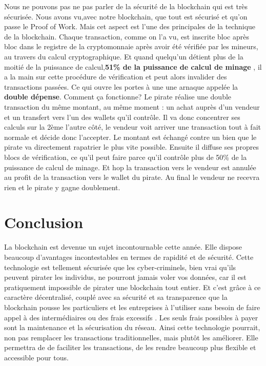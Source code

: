 \documentclass[12pt]{report}
\begin{document}
\hspace{1cm} Nous ne pouvons pas ne pas parler de la sécurité de la blockchain qui est très sécurisée. Nous avons vu,avec notre blockchain, que tout est sécurisé et qu'on passe le Proof of Work. Mais cet aspect est l'une des principales de la technique de la blockchain. Chaque transaction, comme on l'a vu, est inscrite bloc après bloc dans le registre de la cryptomonnaie après avoir été vérifiée par les mineurs, au travers du calcul cryptographique. Et quand quelqu’un détient plus de la moitié de la puissance de calcul,\textbf{51\% de la puissance de calcul de minage} , il a la main sur cette procédure de vérification et peut alors invalider des transactions passées. Ce qui ouvre les portes à une une arnaque appelée la  \textbf{double dépense}. Comment ça fonctionne? Le pirate réalise une double transaction du même montant, au même moment : un achat auprès d'un vendeur et un transfert vers l'un des wallets qu'il contrôle. Il va donc concentrer ses calculs sur la 2ème l'autre côté, le vendeur voit arriver une transaction tout à fait normale et décide donc l’accepter. Le montant est échangé contre un bien que le pirate va directement rapatrier le plus vite possible. Ensuite il diffuse ses propres blocs de vérification, ce qu'il peut faire parce qu'il contrôle plus de 50\% de la puissance de calcul de minage. Et hop la transaction vers le vendeur est annulée au profit de la transaction vers le wallet du pirate. Au final le vendeur ne recevra rien et le pirate y gagne doublement.

 
\newpage    
\section{Conclusion}

\hspace{1cm} La blockchain est devenue un sujet incontournable cette année. Elle dispose beaucoup d'avantages incontestables en termes de rapidité et de sécurité. Cette technologie est tellement sécurisée que les cyber-criminels, bien vrai qu'ils peuvent pirater les individus, ne pourront jamais  voler vos données, car il est pratiquement impossible de pirater une blockchain tout entier. Et c'est grâce à ce caractère décentralisé, couplé avec sa sécurité et sa transparence que la blockchain pousse les particuliers et les entreprises à l'utiliser sans besoin de faire appel à des intermédiaires ou des frais excessifs . Les seuls frais possibles à payer sont la maintenance et la sécurisation du réseau. Ainsi cette technologie pourrait, non pas remplacer les transactions traditionnelles, mais plutôt les améliorer. Elle permettra de de faciliter les transactions, de les rendre beaucoup plus flexible et accessible pour tous. \\ 
\end{document}
